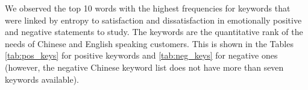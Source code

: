 \documentclass[smallextended,natbib]{svjour3}       %
\begin{document}
    We observed the top 10 words with the highest frequencies for keywords that were linked by entropy to satisfaction and dissatisfaction in emotionally positive and negative statements to study. The keywords are the quantitative rank of the needs of Chinese and English speaking customers. This is shown in the Tables \ref{tab:pos_keys} for positive keywords and \ref{tab:neg_keys} for negative ones (however, the negative Chinese keyword list does not have more than seven keywords available).

    \begin{table}[h]
    \centering
    \caption{Top 10 positive keywords in positive sentences}
    \label{tab:pos_keys}
\end{table}
\end{document}
